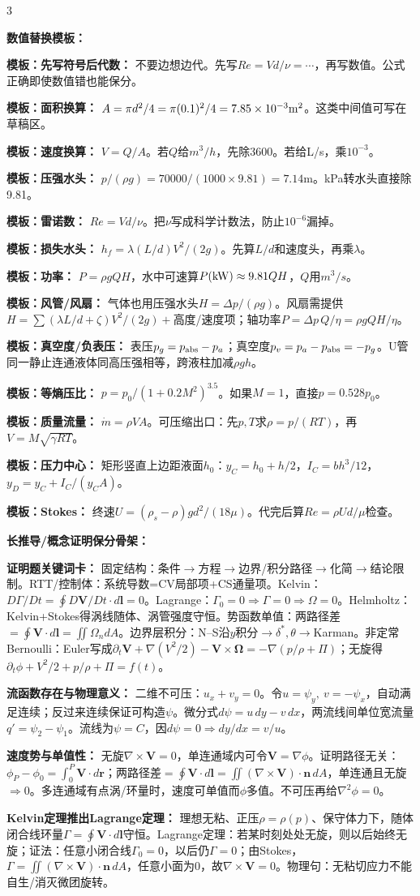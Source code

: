 \documentclass[a4paper]{article}
\newcommand{\sect}[1]{\par{\bfseries\color{Q}#1：}}
\begin{document}
\begin{multicols}{3}
{\sect{数值替换模板}
\sect{模板：先写符号后代数}
不要边想边代。先写$Re=Vd/\nu=\cdots$，再写数值。公式正确即使数值错也能保分。
\sect{模板：面积换算}
$A=\pi d^2/4=\pi(0.1)^2/4=7.85\times10^{-3}{\rm m^2}$。这类中间值可写在草稿区。
\sect{模板：速度换算}
$V=Q/A$。若$Q$给$m^3/h$，先除3600。若给L/s，乘$10^{-3}$。
\sect{模板：压强水头}
$p/(\rho g)=70000/(1000\times9.81)=7.14$m。kPa转水头直接除9.81。
\sect{模板：雷诺数}
$Re=Vd/\nu$。把$\nu$写成科学计数法，防止$10^{-6}$漏掉。
\sect{模板：损失水头}
$h_f=\lambda(L/d)V^2/(2g)$。先算$L/d$和速度头，再乘$\lambda$。
\sect{模板：功率}
$P=\rho gQH$，水中可速算$P({\rm kW})\approx9.81QH$，$Q$用$m^3/s$。
\sect{模板：风管/风扇}
气体也用压强水头$H=\Delta p/(\rho g)$。风扇需提供$H=\sum(\lambda L/d+\zeta)V^2/(2g)+$高度/速度项；轴功率$P=\Delta p\,Q/\eta=\rho gQH/\eta$。
\sect{模板：真空度/负表压}
表压$p_g=p_{\rm abs}-p_a$；真空度$p_v=p_a-p_{\rm abs}=-p_g$。U管同一静止连通液体同高压强相等，跨液柱加减$\rho gh$。
\sect{模板：等熵压比}
$p=p_0/(1+0.2M^2)^{3.5}$。如果$M=1$，直接$p=0.528p_0$。
\sect{模板：质量流量}
$\dot m=\rho VA$。可压缩出口：先$p,T$求$\rho=p/(RT)$，再$V=M\sqrt{\gamma RT}$。
\sect{模板：压力中心}
矩形竖直上边距液面$h_0$：$y_C=h_0+h/2$，$I_C=bh^3/12$，$y_D=y_C+I_C/(y_CA)$。
\sect{模板：Stokes}
终速$U=(\rho_s-\rho)gd^2/(18\mu)$。代完后算$Re=\rho Ud/\mu$检查。
\sect{长推导/概念证明保分骨架}
\sect{证明题关键词卡}
固定结构：条件$\to$方程$\to$边界/积分路径$\to$化简$\to$结论限制。RTT/控制体：系统导数=CV局部项+CS通量项。Kelvin：$D\Gamma/Dt=\oint D\bm V/Dt\cdot d\bm l=0$。Lagrange：$\Gamma_0=0\Rightarrow\Gamma=0\Rightarrow\Omega=0$。Helmholtz：Kelvin+Stokes得涡线随体、涡管强度守恒。势函数单值：两路径差$=\oint\bm V\cdot d\bm l=\iint\Omega_n dA$。边界层积分：N--S沿$y$积分$\to\delta^*,\theta\to$Karman。非定常Bernoulli：Euler写成$\partial_t\bm V+\nabla(V^2/2)-\bm V\times\bm\Omega=-\nabla(p/\rho+\Pi)$；无旋得$\partial_t\phi+V^2/2+p/\rho+\Pi=f(t)$。
\sect{流函数存在与物理意义}
二维不可压：$u_x+v_y=0$。令$u=\psi_y,\ v=-\psi_x$，自动满足连续；反过来连续保证可构造$\psi$。微分式$d\psi=u\,dy-v\,dx$，两流线间单位宽流量$q'=\psi_2-\psi_1$。流线为$\psi=C$，因$d\psi=0\Rightarrow dy/dx=v/u$。
\sect{速度势与单值性}
无旋$\nabla\times\bm V=0$，单连通域内可令$\bm V=\nabla\phi$。证明路径无关：$\phi_P-\phi_0=\int_0^P\bm V\cdot d\bm r$；两路径差$=\oint\bm V\cdot d\bm l=\iint(\nabla\times\bm V)\cdot\bm n\,dA$，单连通且无旋$\Rightarrow0$。多连通域有点涡/环量时，速度可单值而$\phi$多值。不可压再给$\nabla^2\phi=0$。
\sect{Kelvin定理推出Lagrange定理}
理想无粘、正压$\rho=\rho(p)$、保守体力下，随体闭合线环量$\Gamma=\oint\bm V\cdot d\bm l$守恒。Lagrange定理：若某时刻处处无旋，则以后始终无旋；证法：任意小闭合线$\Gamma_0=0$，以后仍$\Gamma=0$；由Stokes，$\Gamma=\iint(\nabla\times\bm V)\cdot\bm n\,dA$，任意小面为0，故$\nabla\times\bm V=0$。物理句：无粘切应力不能自生/消灭微团旋转。
}
\end{multicols}
\end{document}
